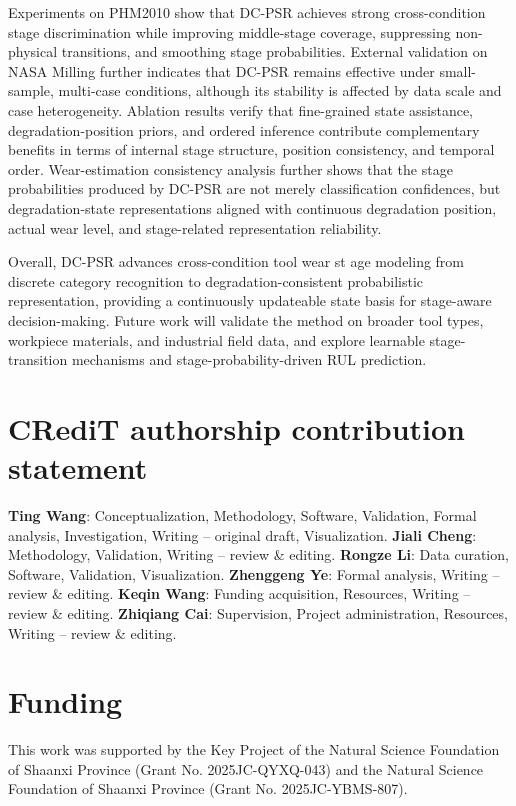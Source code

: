 \documentclass[a4paper,fleqn]{cas-sc}
\begin{document}
  Experiments on PHM2010 show that DC-PSR achieves strong cross-condition stage discrimination while improving middle-stage coverage, suppressing non-physical transitions, and smoothing stage probabilities. External validation on NASA Milling further indicates that DC-PSR remains effective under small-sample, multi-case conditions, although its stability is affected by data scale and case heterogeneity. Ablation results verify that fine-grained state assistance, degradation-position priors, and ordered inference contribute complementary benefits in terms of internal stage structure, position consistency, and temporal order. Wear-estimation consistency analysis further shows that the stage probabilities produced by DC-PSR are not merely classification confidences, but degradation-state representations aligned with continuous degradation position, actual wear level, and stage-related representation reliability.

  Overall, DC-PSR advances cross-condition tool wear st age modeling from discrete category recognition to degradation-consistent probabilistic representation, providing a continuously updateable state basis for stage-aware decision-making. Future work will validate the method on broader tool types, workpiece materials, and industrial field data, and explore learnable stage-transition mechanisms and stage-probability-driven RUL prediction.
  
\section*{CRediT authorship contribution statement}
\textbf{Ting Wang}: Conceptualization, Methodology, Software, Validation, Formal analysis, Investigation, Writing -- original draft, Visualization. 
\textbf{Jiali Cheng}: Methodology, Validation, Writing -- review \& editing. 
\textbf{Rongze Li}: Data curation, Software, Validation, Visualization. 
\textbf{Zhenggeng Ye}: Formal analysis, Writing -- review \& editing. 
\textbf{Keqin Wang}: Funding acquisition, Resources, Writing -- review \& editing. 
\textbf{Zhiqiang Cai}: Supervision, Project administration, Resources, Writing -- review \& editing.

\section*{Funding} This work was supported by the Key Project of the Natural Science Foundation of Shaanxi Province (Grant No. 2025JC-QYXQ-043) and the Natural Science Foundation of Shaanxi Province (Grant No. 2025JC-YBMS-807). 
\end{document}
